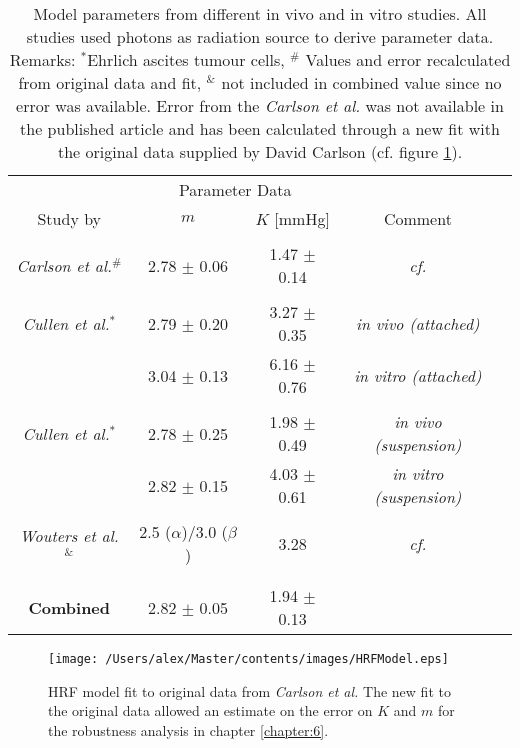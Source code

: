 \begin{table}[tb]
\small
\centering
\begin{tabular}{ccccc}
\toprule
\multicolumn{1}{c}{} & \multicolumn{2}{c}{Parameter Data} \\
\cmidrule(r){2-3}
Study by &  $m$ & $K$ [mmHg] & Comment\\
\midrule\\
\textit{Carlson et al.}\cite{pmid21183291}$^\#$ & 2.78 $\pm$ 0.06 & 1.47 $\pm$ 0.14 & \textit{cf.} \cite{pmid7410133}\cite{pmid6718689}\cite{pmid412319}\cite{pmid17022202}\\\\
\textit{Cullen et al.}\cite{pmid4616914}$^*$	 & 2.79 $\pm$ 0.20 & 3.27 $\pm$ 0.35 & \textit{in vivo (attached)}\\
									 & 3.04 $\pm$ 0.13 & 6.16 $\pm$ 0.76 & \textit{in vitro (attached)}\\\\
\textit{Cullen et al.}\cite{pmid1084867}$^*$	 & 2.78 $\pm$ 0.25 & 1.98 $\pm$ 0.49 & \textit{in vivo (suspension)}\\
									 & 2.82 $\pm$ 0.15 & 4.03 $\pm$ 0.61 & \textit{in vitro (suspension)}\\\\
\textit{Wouters et al.}\cite{pmid9146699}$^\&$  & 2.5 ($\alpha$)/3.0 ($\beta$) & 3.28 & \textit{cf.} \cite{pmid412319}\cite{pmid6718689}\\\\
\bottomrule\\
\textbf{Combined} & 2.82 $\pm$ 0.05 & 1.94 $\pm$ 0.13 & 
\end{tabular}
\caption{Model parameters from different in vivo and in vitro studies. All studies used photons as radiation source to derive parameter data. Remarks: $^*$Ehrlich ascites tumour cells, $^\#$ Values and error recalculated from original data and fit, $^\&$ not included in combined value since no error was available. Error from the \textit{Carlson et al.} was not available in the published article and has been calculated through a new fit with the original data supplied by David Carlson (cf. figure \ref{fig:HRFModel}).}
\label{tab:modelparameter}
\end{table}
\begin{figure}[htb]
\centering
\texttt{[image: /Users/alex/Master/contents/images/HRFModel.eps]}
\caption{HRF model fit to original data from \textit{Carlson et al.}\cite{pmid21183291} The new fit to the original data allowed an estimate on the error on $K$ and $m$ for the robustness analysis in chapter \ref{chapter:6}.}
\label{fig:HRFModel}
\end{figure}
